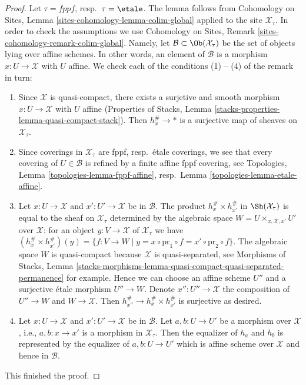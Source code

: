 \begin{proof}
Let $\tau = fppf$, resp.\ $\tau = \etale$. The lemma follows from
Cohomology on Sites, Lemma \ref{sites-cohomology-lemma-colim-global}
applied to the site $\mathcal{X}_\tau$. In order to check the assumptions we
use Cohomology on Sites, Remark \ref{sites-cohomology-remark-colim-global}.
Namely, let $\mathcal{B} \subset \Ob(\mathcal{X}_\tau)$ be the set
of objects lying over affine schemes. In other words, an element
of $\mathcal{B}$ is a morphism $x : U \to \mathcal{X}$ with $U$ affine.
We check each of the conditions (1) -- (4) of the remark in turn:
\begin{enumerate}
\item Since $\mathcal{X}$ is quasi-compact, there exists a
surjetive and smooth morphism $x : U \to \mathcal{X}$ with $U$ affine
(Properties of Stacks, Lemma
\ref{stacks-properties-lemma-quasi-compact-stack}).
Then $h_x^\# \to *$ is a surjective map of sheaves on $\mathcal{X}_\tau$.
\item Since coverings in $\mathcal{X}_\tau$ are fppf, resp.\ \'etale
coverings, we see that every covering of $U \in \mathcal{B}$ is refined
by a finite affine fppf covering, see
Topologies, Lemma \ref{topologies-lemma-fppf-affine},
resp.\ Lemma \ref{topologies-lemma-etale-affine}.
\item Let $x : U \to \mathcal{X}$ and $x' : U' \to \mathcal{X}$ be
in $\mathcal{B}$. The product $h_x^\# \times h_{x'}^\#$ in
$\Sh(\mathcal{X}_\tau)$ is equal to the sheaf on $\mathcal{X}_\tau$
determined by the algebraic space $W = U \times_{x, \mathcal{X}, x'} U'$ over
$\mathcal{X}$: for an object $y : V \to \mathcal{X}$ of
$\mathcal{X}_\tau$ we have
$(h_x^\# \times h_{x'}^\#)(y) = \{f : V \to W \mid y =
x \circ \text{pr}_1 \circ f = x' \circ \text{pr}_2 \circ f\}$.
The algebraic space $W$ is quasi-compact because $\mathcal{X}$
is quasi-separated, see Morphisms of Stacks, Lemma
\ref{stacks-morphisms-lemma-quasi-compact-quasi-separated-permanence}
for example. Hence we can choose an affine scheme $U''$ and
a surjective \'etale morphism $U'' \to W$. Denote $x'' : U'' \to \mathcal{X}$
the composition of $U'' \to W$ and $W \to \mathcal{X}$. Then
$h_{x''}^\# \to h_x^\# \times h_{x'}^\#$ is surjective as desired.
\item Let $x : U \to \mathcal{X}$ and $x' : U' \to \mathcal{X}$ be
in $\mathcal{B}$. Let $a, b : U \to U'$ be a morphism over $\mathcal{X}$,
i.e., $a, b  : x \to x'$ is a morphism in $\mathcal{X}_\tau$.
Then the equalizer of $h_a$ and $h_b$ is represented by the
equalizer of $a, b : U \to U'$ which is
affine scheme over $\mathcal{X}$ and hence in $\mathcal{B}$.
\end{enumerate}
This finished the proof.
\end{proof}

